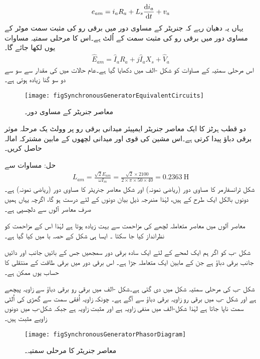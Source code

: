\begin{align}
e_{am}=i_a R_a+L_s \frac{\dif i_a}{\dif t}+v_a
\end{align}
یہاں یہ دھیان رہے کہ جنریٹر کے مساوی دور میں برقی رو کی مثبت سمت موٹر کے مساوی دور میں برقی رو کی مثبت سمت کے اُلٹ ہے۔اس کا مرحلی سمتیہ مساوات یوں لکھا جائے گا۔
\begin{align}\label{مساوات_معاصر_جنریٹر_دوری_سمتیہ_مساوات}
\hat{E}_{am}= \hat{I}_a R_a+j \hat{I}_a X_s +\hat{V}_a
\end{align}
اس مرحلی سمتیہ کے مساوات کو شکل -الف میں دکھایا گیا ہے۔عام حالات میں  کی مقدار   سے سو سے دو سو گنا زیادہ ہوتی ہے۔ 
\begin{figure}
\centering
\texttt{[image: figSynchronousGeneratorEquivalentCircuits]}
\caption{معاصر جنریٹر کے مساوی دور۔}
\label{شکل_معاصر_جنریٹر_کے_سادہ_مساوی_دور}
\end{figure}

دو قطب  ہرٹز کا ایک معاصر جنریٹر  ایمپیئر میدانی برقی رو پر   وولٹ یک مرحلہ موثر برقی دباؤ پیدا کرتی ہے۔اس مشین کی قوی اور میدانی لچھوں کے مابین مشترکہ امالہ حاصل کریں۔

	حل:
	مساوات   سے 
\begin{align}
L_{am}=\frac{\sqrt{2} E_{am}}{\omega I_m}=\frac{\sqrt{2}  \times 2100}{2 \times \pi \times 50 \times 40}=\SI{0.2363}{\henry}
\end{align}
%
شکل  ٹرانسفارمر کا مساوی دور (ریاضی نمونہ) اور شکل  معاصر جنریٹر کا مساوی دور (ریاضی نمونہ) ہے۔ دونوں بالکل ایک طرح کے ہیں، لہٰذا مندرجہ ذیل بیان دونوں کے لئے درست ہو گا، اگرچہ یہاں ہمیں صرف معاصر آلوں سے دلچسپی ہے۔

معاصر آلوں میں معاصر متعاملہ لچھے کی مزاحمت سے بہت زیادہ ہوتا ہے لہٰذا اس کے مزاحمت کو نظرانداز کیا جا سکتا ۔ ایسا ہی شکل کے حصہ با میں کیا گیا ہے۔

شکل -ب کو اگر ہم ایک لمحے کے لئے ایک سادہ برقی دور سمجھیں جس کے بائیں جانب  اور دائیں جانب  برقی دباؤ ہے جن کے مابین ایک متعاملہ  جڑا ہے۔ اس برقی دور میں برقی طاقت کے منتقلی کا حساب یوں ممکن ہے۔

 شکل -ب کی مرحلی سمتیہ شکل   میں دی گئی ہے۔شکل -الف میں  برقی رو  برقی دباؤ  سے   زاویہ  پیچھے  ہے اور شکل -ب میں برقی رو  زاویہ برقی دباؤ سے  آگے  ہے۔ چونکہ زاویہ اُفقی سمت سے گھڑی کی اُلٹی سمت ناپا جاتا ہے لہٰذا شکل-الف میں  منفی زاویہ ہے اور  مثبت زاویہ ہے جبکہ شکل-ب میں دونوں زاویے مثبت ہیں۔
\begin{figure}
\centering
\texttt{[image: figSynchronousGeneratorPhasorDiagram]}
\caption{معاصر جنریٹر کا مرحلی سمتیہ۔}
\label{شکل_معاصر_جنریٹر_دوری_سمتیہ}
\end{figure}

